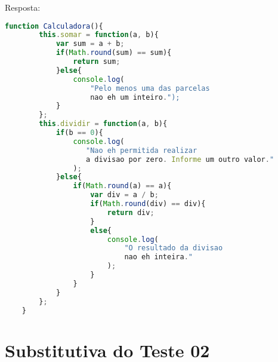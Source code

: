 \documentclass[12pt,a4paper,oneside]{article}
\begin{document}
\begin{enumerate}
	{\color{blue} Resposta: }
	
	\begin{lstlisting}[language=JavaScript]
	function Calculadora(){
		this.somar = function(a, b){
			var sum = a + b;
			if(Math.round(sum) == sum){
				return sum;
			}else{
				console.log(
					"Pelo menos uma das parcelas 
					nao eh um inteiro.");
			}
		};
		this.dividir = function(a, b){
			if(b == 0){
				console.log(
				   "Nao eh permitida realizar 
				   a divisao por zero. Informe um outro valor."
				);
			}else{
				if(Math.round(a) == a){
					var div = a / b;
					if(Math.round(div) == div){
						return div;
					}
					else{
						console.log(
							"O resultado da divisao 
							nao eh inteira."
						);
					}
				}
			}
		};
	}\end{lstlisting}
	
	\newpage
	
	\section*{Substitutiva do Teste 02}
	

\end{enumerate}
\end{document}
